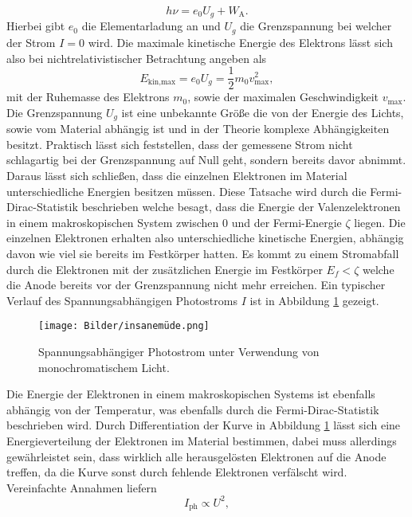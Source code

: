 \begin{equation}
    \label{eq:imp}
    h \nu = e_{0} U_{g} + W_{\text{A}}.
\end{equation}
Hierbei gibt $e_{0}$ die Elementarladung an und $U_{g}$ die Grenzspannung bei welcher der Strom $I = 0$ wird. Die maximale kinetische Energie des Elektrons lässt sich also bei nichtrelativistischer Betrachtung angeben als
\begin{equation*}
    E_{\text{kin,max}} = e_{0} U_{g} = \frac{1}{2} m_{0} v_{\text{max}}^2,
\end{equation*}
mit der Ruhemasse des Elektrons $m_{0}$, sowie der maximalen Geschwindigkeit $v_{\text{max}}$.
Die Grenzspannung $U_{g}$ ist eine unbekannte Größe die von der Energie des Lichts, sowie vom Material abhängig ist und in der Theorie komplexe Abhängigkeiten besitzt. Praktisch lässt sich feststellen, dass der gemessene Strom nicht schlagartig bei der 
Grenzspannung auf Null geht, sondern bereits davor abnimmt. Daraus lässt sich schließen, dass die einzelnen Elektronen im Material unterschiedliche Energien besitzen müssen. Diese Tatsache wird durch die Fermi-Dirac-Statistik beschrieben welche besagt,
dass die Energie der Valenzelektronen in einem makroskopischen System zwischen $0$ und der Fermi-Energie $\zeta$ liegen. Die einzelnen Elektronen erhalten also unterschiedliche kinetische Energien, abhängig davon wie viel sie bereits im Festkörper hatten. Es kommt zu einem Stromabfall 
durch die Elektronen mit der zusätzlichen Energie im Festkörper $E_{f} < \zeta$ welche die Anode bereits vor der Grenzspannung nicht mehr erreichen.
Ein typischer Verlauf des Spannungsabhängigen Photostroms $I$ ist in Abbildung \ref{fig:fermishit} gezeigt.
\begin{figure}
    \centering
    \texttt{[image: Bilder/insanemüde.png]}
    \caption{Spannungsabhängiger Photostrom unter Verwendung von monochromatischem Licht. \cite{skript}} 
    \label{fig:fermishit}
\end{figure}
Die Energie der Elektronen in einem makroskopischen Systems ist ebenfalls abhängig von der Temperatur, was ebenfalls durch die Fermi-Dirac-Statistik beschrieben wird. Durch Differentiation der Kurve in Abbildung \ref{fig:fermishit} lässt sich eine 
Energieverteilung der Elektronen im Material bestimmen, dabei muss allerdings gewährleistet sein, dass wirklich alle herausgelösten Elektronen auf die Anode treffen, da die Kurve sonst durch fehlende Elektronen verfälscht wird.
Vereinfachte Annahmen liefern 
\begin{equation}
    \label{eq:whatisthis}
I_{\text{ph}} \propto U^2,
\end{equation}
